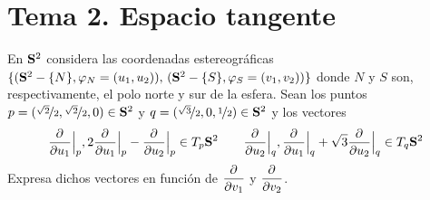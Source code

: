 \section{Tema 2. Espacio tangente}
\begin{ejer}
    [2.3] En $\bold S^2$ considera las coordenadas estereogr\'aficas $\{(\bold S^2 - \{N\}, \varphi_N=(u_1,u_2)), \, (\bold S^2 - \{S\}, \varphi_S=(v_1,v_2))\}$ donde $N$ y $S$ son, respectivamente, el polo norte y sur de la esfera. Sean los puntos $p=(\nicefrac{\sqrt{2}}{2}, \nicefrac{\sqrt{2}}{2}, 0) \in \bold S^2$ y $q=(\nicefrac{\sqrt{3}}{2}, 0, \nicefrac{1}{2}) \in \bold S^2$ y los vectores
    $$\dfrac{\partial^{} }{\partial u_1} \Big|_p, 2\dfrac{\partial^{} }{\partial u_1} \Big|_p - \dfrac{\partial^{} }{\partial u_2} \Big|_p \in T_p \bold S^2 \qquad \dfrac{\partial^{} }{\partial u_2} \Big|_q , \dfrac{\partial^{} }{\partial u_1} \Big|_q + \sqrt{3} \dfrac{\partial^{} }{\partial u_2} \Big|_q \in T_q \bold S^2$$
    Expresa dichos vectores en funci\'on de $\dfrac{\partial^{} }{\partial v_1}$ y $\dfrac{\partial^{} }{\partial v_2}$.
\end{ejer}
